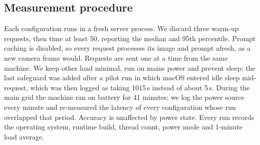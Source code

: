 \subsection{Measurement procedure}
\label{sec:procedure}
Each configuration runs in a fresh server process. We discard three warm-up requests, then time at least 50, reporting the median and 95th percentile. Prompt caching is disabled, so every request processes its image and prompt afresh, as a new camera frame would. Requests are sent one at a time from the same machine. We keep other load minimal, run on mains power and prevent sleep; the last safeguard was added after a pilot run in which macOS entered idle sleep mid-request, which was then logged as taking 1015\,s instead of about 5\,s. During the main grid the machine ran on battery for 41 minutes; we log the power source every minute and re-measured the latency of every configuration whose run overlapped that period. Accuracy is unaffected by power state. Every run records the operating system, runtime build, thread count, power mode and 1-minute load average.
